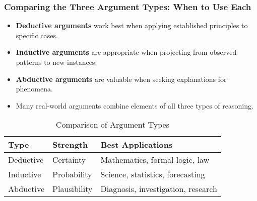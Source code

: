 \documentclass{beamer}
\begin{document}
\begin{frame}
    \frametitle{Comparing the Three Argument Types: When to Use Each}
    \begin{itemize}
        \item \textbf{Deductive arguments} work best when applying established principles to specific cases.
        \item \textbf{Inductive arguments} are appropriate when projecting from observed patterns to new instances.
        \item \textbf{Abductive arguments} are valuable when seeking explanations for phenomena.
        \item Many real-world arguments combine elements of all three types of reasoning.
    \end{itemize}
    
    \begin{table}
        \begin{tabular}{|l|l|l|}
            \hline
            \textbf{Type} & \textbf{Strength} & \textbf{Best Applications} \\
            \hline
            Deductive & Certainty & Mathematics, formal logic, law \\
            \hline
            Inductive & Probability & Science, statistics, forecasting \\
            \hline
            Abductive & Plausibility & Diagnosis, investigation, research \\
            \hline
        \end{tabular}
        \caption{Comparison of Argument Types}
    \end{table}
\end{frame}
\end{document}
